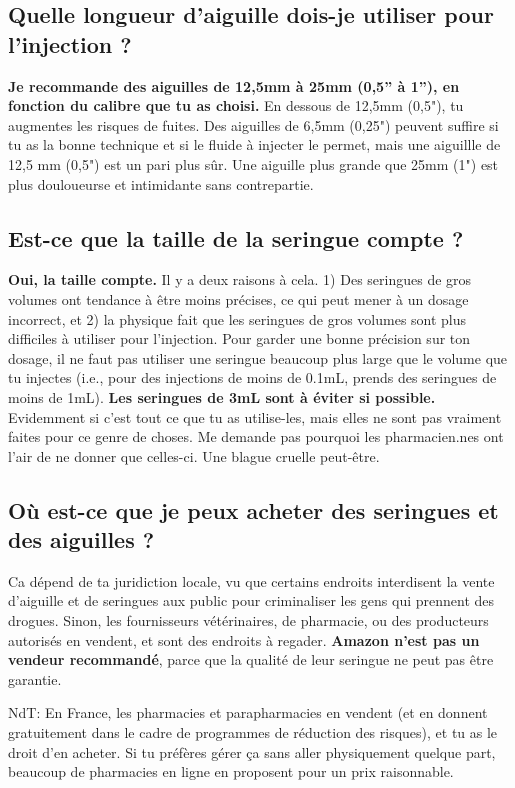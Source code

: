 \documentclass{article}
\begin{document}
\subsection{Quelle longueur d'aiguille dois-je utiliser pour l'injection ?}

\textbf{Je recommande des aiguilles de 12,5mm à 25mm (0,5” à 1”), en fonction du calibre que tu as choisi.} En dessous de 12,5mm (0,5"), tu augmentes les risques de fuites. Des aiguilles de 6,5mm (0,25") peuvent suffire si tu as la bonne technique et si le fluide à injecter le permet, mais une aiguillle de 12,5 mm (0,5") est un pari plus sûr. Une aiguille plus grande que 25mm (1") est plus douloueurse et intimidante sans contrepartie.

\subsection{Est-ce que la taille de la seringue compte ?}

\textbf{Oui, la taille compte.} Il y a deux raisons à cela. 1) Des seringues de gros volumes ont tendance à être moins précises, ce qui peut mener à un dosage incorrect, et 2) la physique fait que les seringues de gros volumes sont plus difficiles à utiliser pour l'injection. Pour garder une bonne précision sur ton dosage, il ne faut pas utiliser une seringue beaucoup plus large que le volume que tu injectes (i.e., pour des injections de moins de 0.1mL, prends des seringues de moins de 1mL). \textbf{Les seringues de 3mL sont à éviter si possible.} Evidemment si c'est tout ce que tu as utilise-les, mais elles ne sont pas vraiment faites pour ce genre de choses. Me demande pas pourquoi les pharmacien.nes ont l'air de ne donner que celles-ci. Une blague cruelle peut-être. 

\subsection{Où est-ce que je peux acheter des seringues et des aiguilles ?}

Ca dépend de ta juridiction locale, vu que certains endroits interdisent la vente d'aiguille et de seringues aux public pour criminaliser les gens qui prennent des drogues. Sinon, les fournisseurs vétérinaires, de pharmacie, ou des producteurs autorisés en vendent, et sont des endroits à regader. \textbf{Amazon n'est pas un vendeur recommandé}, parce que la qualité de leur seringue ne peut pas être garantie.

NdT: En France, les pharmacies et parapharmacies en vendent (et en donnent gratuitement dans le cadre de programmes de réduction des risques), et tu as le droit d'en acheter. Si tu préfères gérer ça sans aller physiquement quelque part, beaucoup de pharmacies en ligne en proposent pour un prix raisonnable.
\end{document}
